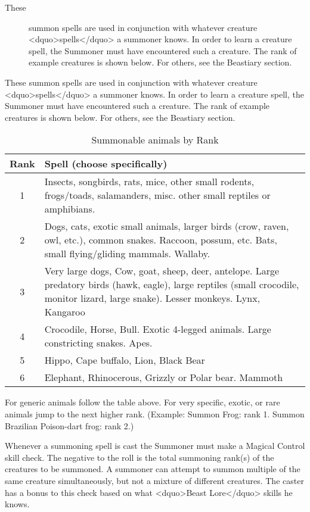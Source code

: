 \begin{description}
\item[These] summon spells are used in conjunction with whatever
  creature <dquo>spells</dquo> a summoner knows.  In order to learn a creature
  spell, the Summoner must have encountered such a creature.  The rank
  of example creatures is shown below.  For others, see the Beastiary
  section.
\end{description}

These summon spells are used in conjunction with whatever creature
<dquo>spells</dquo> a summoner knows.  In order to learn a creature spell, the
Summoner must have encountered such a creature.  The rank of example
creatures is shown below.  For others, see the Beastiary section.

\begin{table}[htb]
\begin{center}
\begin{tabular}{c|p{4.5in}}
\textbf{Rank} & \textbf{Spell (choose specifically)} \\
\hline
\hline
1 & Insects, songbirds, rats, mice, other small rodents, frogs/toads, salamanders, misc. other small reptiles or amphibians. \\ \hline
2 & Dogs, cats, exotic small animals, larger birds (crow, raven, owl, etc.), common snakes.  Raccoon, possum, etc.  Bats, small flying/gliding mammals.  Wallaby. \\ \hline
3 & Very large dogs, Cow, goat, sheep, deer, antelope.  Large predatory birds (hawk, eagle), large reptiles (small crocodile, monitor lizard, large snake).  Lesser monkeys.  Lynx, Kangaroo \\ \hline
4 & Crocodile, Horse, Bull.  Exotic 4-legged animals.  Large constricting snakes.  Apes. \\ \hline
5 & Hippo, Cape buffalo, Lion, Black Bear \\ \hline
6 & Elephant, Rhinocerous, Grizzly or Polar bear.  Mammoth \\
\end{tabular}
\caption{Summonable animals by Rank}
\end{center}
\end{table}

For generic animals follow the table above.  For very specific,
exotic, or rare animals jump to the next higher rank.  (Example:
Summon Frog: rank 1.  Summon Brazilian Poison-dart frog: rank 2.)

Whenever a summoning spell is cast the Summoner must make a Magical
Control skill check.  The negative to the roll is the total summoning
rank(s) of the creatures to be summoned.  A summoner can attempt to
summon multiple of the same creature simultaneously, but not a mixture
of different creatures.  The caster has a bonus to this check based on
what <dquo>Beast Lore</dquo> skills he knows.

